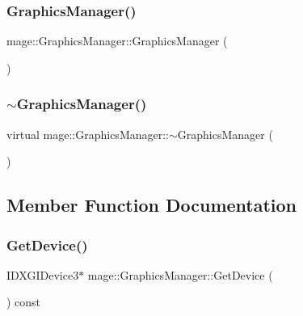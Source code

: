 \subsubsection{\texorpdfstring{Graphics\+Manager()}{GraphicsManager()}}
{\footnotesize\ttfamily mage\+::\+Graphics\+Manager\+::\+Graphics\+Manager (\begin{DoxyParamCaption}{ }\end{DoxyParamCaption})}

\hypertarget{classmage_1_1_graphics_manager_adbf3daeef9b079be665ac22d678ad1a0}{}\label{classmage_1_1_graphics_manager_adbf3daeef9b079be665ac22d678ad1a0} 
\subsubsection{\texorpdfstring{$\sim$\+Graphics\+Manager()}{~GraphicsManager()}}
{\footnotesize\ttfamily virtual mage\+::\+Graphics\+Manager\+::$\sim$\+Graphics\+Manager (\begin{DoxyParamCaption}{ }\end{DoxyParamCaption})\hspace{0.3cm}{\ttfamily [virtual]}}



\subsection{Member Function Documentation}
\hypertarget{classmage_1_1_graphics_manager_a707167960d108ab09a06420182ccfaba}{}\label{classmage_1_1_graphics_manager_a707167960d108ab09a06420182ccfaba} 
\subsubsection{\texorpdfstring{Get\+Device()}{GetDevice()}}
{\footnotesize\ttfamily I\+D\+X\+G\+I\+Device3$\ast$ mage\+::\+Graphics\+Manager\+::\+Get\+Device (\begin{DoxyParamCaption}{ }\end{DoxyParamCaption}) const}

\hypertarget{classmage_1_1_graphics_manager_ac7a14c40d0dd52cb1b76de16c81b42d4}{}\label{classmage_1_1_graphics_manager_ac7a14c40d0dd52cb1b76de16c81b42d4} 
